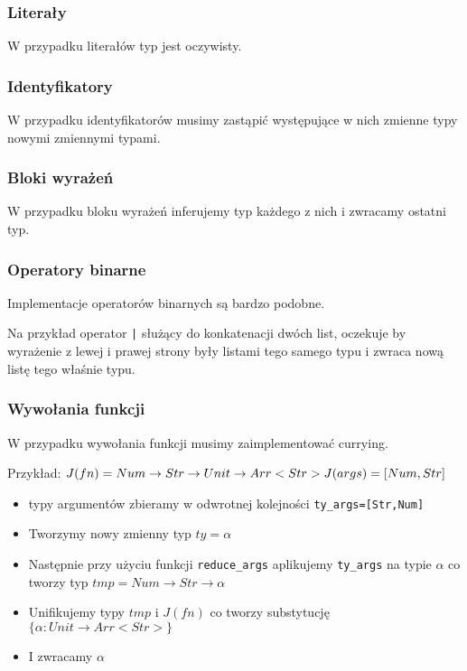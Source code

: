 \documentclass{article}
\begin{document}
\subsubsection{Literały}
W przypadku literałów typ jest oczywisty.

\subsubsection{Identyfikatory}
W przypadku identyfikatorów musimy zastąpić występujące w nich zmienne typy nowymi zmiennymi typami.

\subsubsection{Bloki wyrażeń}
W przypadku bloku wyrażeń inferujemy typ każdego z nich i zwracamy ostatni typ.


\subsubsection{Operatory binarne}
Implementacje operatorów binarnych są bardzo podobne.

Na przykład operator \lstinline{|} służący do konkatenacji dwóch list, oczekuje by wyrażenie z lewej i prawej strony były listami tego samego typu i zwraca nową listę tego właśnie typu.\newpage

\subsubsection{Wywołania funkcji}
W przypadku wywołania funkcji musimy zaimplementować currying.

Przykład: $J(fn)=Num\rightarrow Str\rightarrow Unit\rightarrow Arr<Str>\\ J(args)=[Num,Str]$
\begin{itemize}
  \item typy argumentów zbieramy w odwrotnej kolejności \lstinline{ty_args=[Str,Num]}
  \item Tworzymy nowy zmienny typ $ty=\alpha$
  \item Następnie przy użyciu funkcji \lstinline{reduce_args} aplikujemy \lstinline{ty_args} na typie $\alpha$ co tworzy typ $tmp=Num\rightarrow Str\rightarrow \alpha$
  \item Unifikujemy typy $tmp$ i $J(fn)$ co tworzy substytucję $\{\alpha: Unit\rightarrow Arr<Str>\}$
  \item I zwracamy $\alpha$
\end{itemize}

\end{document}
